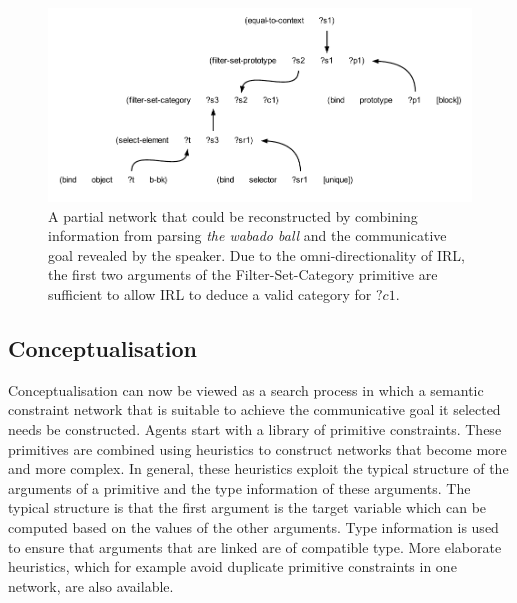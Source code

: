 \begin{figure}[htbp]
  \begin{center}
    \includegraphics[width=\textwidth]{./frameworks/figures/network-learning.pdf}
    \caption[Example constraint network during learning]{A partial
      network that could be reconstructed by combining information
      from parsing \textit{the wabado ball} and the communicative goal
      revealed by the speaker. Due to the omni-directionality of IRL,
      the first two arguments of the {\sc Filter-Set-Category}
      primitive are sufficient to allow IRL to deduce a valid category
      for $?c1$.}
    \label{f:network-learning}
  \end{center}
\end{figure}

\subsection{Conceptualisation}
\label{s:irl-conceptualisation}

Conceptualisation can now be viewed as a search process in which a
semantic constraint network that is suitable to achieve the
communicative goal it selected \citep{steels05planning} needs be
constructed. Agents start with a library of primitive
constraints. These primitives are combined using heuristics to
construct networks that become more and more complex. In general,
these heuristics exploit the typical structure of the arguments of a
primitive and the type information of these arguments. The typical
structure is that the first argument is the target variable which can
be computed based on the values of the other arguments. Type
information is used to ensure that arguments that are linked are of
compatible type. More elaborate heuristics, which for example avoid
duplicate primitive constraints in one network, are also available.

